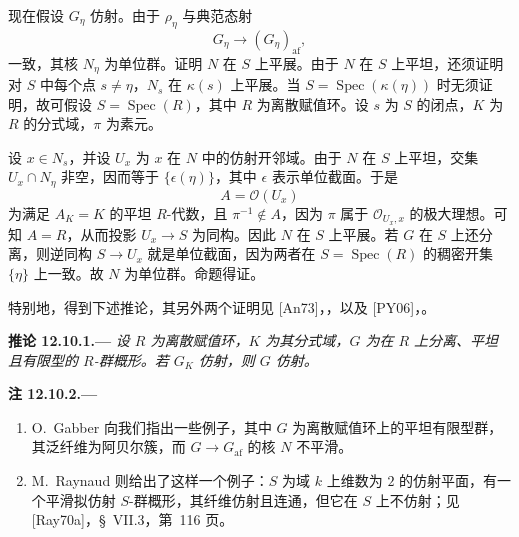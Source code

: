 现在假设 \(G_\eta\) 仿射。由于 \(\rho_\eta\) 与典范态射
\[
  G_\eta\longrightarrow(G_\eta)_{\mathrm{af}},
\]
一致，其核 \(N_\eta\) 为单位群。证明 \(N\) 在 \(S\) 上平展。由于 \(N\) 在 \(S\) 上平坦，还须证明对 \(S\) 中每个点 \(s\neq\eta\)，\(N_s\) 在 \(\kappa(s)\) 上平展。当 \(S=\operatorname{Spec}(\kappa(\eta))\) 时无须证明，故可假设 \(S=\operatorname{Spec}(R)\)，其中 \(R\) 为离散赋值环。设 \(s\) 为 \(S\) 的闭点，\(K\) 为 \(R\) 的分式域，\(\pi\) 为素元。

设 \(x\in N_s\)，并设 \(U_x\) 为 \(x\) 在 \(N\) 中的仿射开邻域。由于 \(N\) 在 \(S\) 上平坦，交集 \(U_x\cap N_\eta\) 非空，因而等于 \(\{\epsilon(\eta)\}\)，其中 \(\epsilon\) 表示单位截面。于是
\[
  A=\mathcal O(U_x)
\]
为满足 \(A_K=K\) 的平坦 \(R\)-代数，且 \(\pi^{-1}\notin A\)，因为 \(\pi\) 属于 \(\mathcal O_{U_x,x}\) 的极大理想。可知 \(A=R\)，从而投影 \(U_x\to S\) 为同构。因此 \(N\) 在 \(S\) 上平展。若 \(G\) 在 \(S\) 上还分离，则逆同构 \(S\to U_x\) 就是单位截面，因为两者在 \(S=\operatorname{Spec}(R)\) 的稠密开集 \(\{\eta\}\) 上一致。故 \(N\) 为单位群。命题得证。

特别地，得到下述推论，其另外两个证明见 \textup{[An73]}，，以及 \textup{[PY06]}，。

\medskip
{}\label{cor:sga3-VIB-12.10.1}%
\noindent\textbf{推论 12.10.1.---}
\emph{设 \(R\) 为离散赋值环，\(K\) 为其分式域，\(G\) 为在 \(R\) 上分离、平坦且有限型的 \(R\)-群概形。若 \(G_K\) 仿射，则 \(G\) 仿射。}

\medskip
{}\label{rem:sga3-VIB-12.10.2}%
\noindent\textbf{注 12.10.2.---}
\begin{enumerate}
\item[\textup{(a)}]\label{rem:sga3-VIB-12.10.2-a}%
  O.~Gabber 向我们指出一些例子，其中 \(G\) 为离散赋值环上的平坦有限型群，其泛纤维为阿贝尔簇，而 \(G\to G_{\mathrm{af}}\) 的核 \(N\) 不平滑。

\item[\textup{(b)}]\label{rem:sga3-VIB-12.10.2-b}%
  M.~Raynaud 则给出了这样一个例子：\(S\) 为域 \(k\) 上维数为 \(2\) 的仿射平面，有一个平滑拟仿射 \(S\)-群概形，其纤维仿射且连通，但它在 \(S\) 上不仿射；见 \textup{[Ray70a]}，\S~VII.3，第~116 页。
\end{enumerate}
